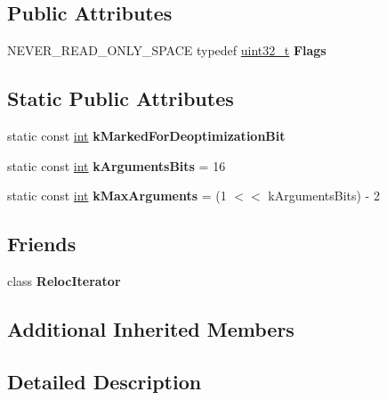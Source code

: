 \subsection*{Public Attributes}
\begin{DoxyCompactItemize}
\item 
\mbox{\label{classv8_1_1internal_1_1Code_a88195b77d9248887838b3301b5e2109d}} 
N\+E\+V\+E\+R\+\_\+\+R\+E\+A\+D\+\_\+\+O\+N\+L\+Y\+\_\+\+S\+P\+A\+CE typedef \mbox{\hyperlink{classuint32__t}{uint32\+\_\+t}} {\bfseries Flags}
\end{DoxyCompactItemize}
\subsection*{Static Public Attributes}
\begin{DoxyCompactItemize}
\item 
static const \mbox{\hyperlink{classint}{int}} {\bfseries k\+Marked\+For\+Deoptimization\+Bit}
\item 
\mbox{\label{classv8_1_1internal_1_1Code_afc85158e43b6593d59c6438ce9ddf8ab}} 
static const \mbox{\hyperlink{classint}{int}} {\bfseries k\+Arguments\+Bits} = 16
\item 
\mbox{\label{classv8_1_1internal_1_1Code_a9115cb13cc6486de35b21a2bb82aee65}} 
static const \mbox{\hyperlink{classint}{int}} {\bfseries k\+Max\+Arguments} = (1 $<$$<$ k\+Arguments\+Bits) -\/ 2
\end{DoxyCompactItemize}
\subsection*{Friends}
\begin{DoxyCompactItemize}
\item 
\mbox{\label{classv8_1_1internal_1_1Code_a9ff673d9f08f4ce3738760e4e66dc88a}} 
class {\bfseries Reloc\+Iterator}
\end{DoxyCompactItemize}
\subsection*{Additional Inherited Members}


\subsection{Detailed Description}



